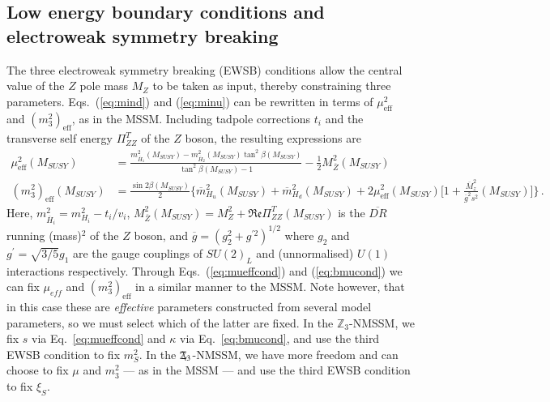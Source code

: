 \documentclass[final,3p,times,pdflatex]{elsarticle}
\newcommand{\Zv}{\,\mathbf{\backslash}\mkern-11.0mu{\mathbb{Z}}_{3}} %
\begin{document}
\subsection{Low energy boundary conditions and electroweak 
symmetry breaking \label{ewsb}} 
The three electroweak symmetry breaking (EWSB) conditions allow the central 
value of the $Z$ pole mass $M_Z$ to be taken as input, thereby constraining 
three parameters. Eqs.~(\ref{eq:mind}) and (\ref{eq:minu}) can be rewritten in
terms 
 of $\mu_\textrm{eff}^2$ and $(m_3^2)_\textrm{eff}$, as in the MSSM. Including 
tadpole corrections $t_i$ and the transverse self energy $\Pi^T_{ZZ}$ of the $Z$ 
boson, the resulting expressions are 
%
\begin{align}
  \mu_\textrm{eff}^2(M_{SUSY}) &=
  \frac{m_{\overline{H}_1}^2(M_{SUSY}) -
    m_{\overline{H}_2}^2(M_{SUSY}) \tan^2 \beta(M_{SUSY})}{\tan^2
    \beta(M_{SUSY}) - 1} - \frac{1}{2} M_{\overline Z}^2
  (M_{SUSY})\label{eq:mueffcond}\\ 
%
  (m^2_3)_\textrm{eff}(M_{SUSY})&=\frac{\sin{2\beta}(M_{SUSY})}{2}\Bigg\{\overline{m}_{H_u}^2(M_{SUSY})+\overline{m}_{H_d}^2(M_{SUSY})+
  2\mu_\textrm{eff}^2(M_{SUSY})\Bigg[1+\frac{\overline{M}_z^2}{\overline{g}^2s^2}(M_{SUSY})\Bigg]\Bigg\}\,.\label{eq:bmucond}
\end{align} 
% 
Here, $m_{\overline{H}_i}^2 = m_{H_i}^2 - t_i/v_i$, 
$M_{\overline Z}^2(M_{SUSY}) = M_Z^2 + \Re\mathfrak{e}\Pi_{ZZ}^T(M_{SUSY})$ is the 
$\overline{DR}$ running (mass)$^2$ of the $Z$ boson, and 
$\overline{g} = (g_2^2+g^{\prime 2})^{1/2}$ where $g_2$ and $g^{\prime}=\sqrt{3/5}g_1$
are the gauge couplings of $SU(2)_L$ and (unnormalised) $U(1)$ interactions 
respectively.  Through Eqs.~(\ref{eq:mueffcond}) and (\ref{eq:bmucond}) we
can fix $\mu_{eff}$ and $(m^2_3)_\textrm{eff}$ in a similar manner
to the MSSM.  Note however, that in this case these are {\it effective} 
parameters constructed from several model parameters, so we must select which
of the latter are fixed.
In the $\mathbb{Z}_3$-NMSSM, we fix $s$ via Eq.~\ref{eq:mueffcond} and $\kappa$
via Eq.~\ref{eq:bmucond}, and use the third EWSB condition to fix
$m_S^2$.  In the $\Zv$-NMSSM, we have more freedom and can choose to fix
$\mu$ and $m_3^2$ --- as in the MSSM --- and use the third EWSB
condition to fix $\xi_S$.
\end{document}
